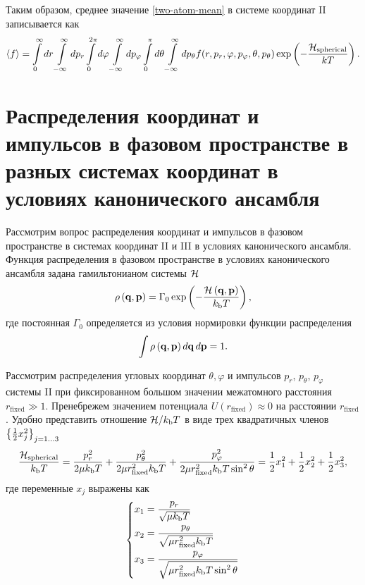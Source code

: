 Таким образом, среднее значение \eqref{two-atom-mean} в системе координат II записывается как
\begin{gather}
    \langle f \rangle = \int\limits_0^\infty dr \int\limits_{-\infty}^\infty dp_r \int\limits_0^{2\pi} d\varphi \int\limits_{-\infty}^\infty dp_\varphi \int\limits_0^\pi d\theta \int\limits_{-\infty}^\infty dp_\theta f(r, p_r, \varphi, p_\varphi, \theta, p_\theta) \exp \left( -\frac{\mathcal{H}_\text{spherical}}{k T} \right). \label{two-atom-mean-spherical}
\end{gather}

\section{Распределения координат и импульсов в фазовом пространстве в разных системах координат в условиях канонического ансамбля}

Рассмотрим вопрос распределения координат и импульсов в фазовом пространстве в системах координат II и III в условиях канонического ансамбля. Функция распределения в фазовом пространстве в условиях канонического ансамбля задана гамильтонианом системы $\mathcal{H}$ \cite{hill} 
\begin{gather}
    \rho \left( \mathbf{q}, \mathbf{p} \right) = \Gamma_0 \exp \left( -\frac{\mathcal{H} \left( \mathbf{q}, \mathbf{p} \right)}{k_\text{b} T} \right),
\end{gather}
% 
где постоянная $\Gamma_0$ определяется из условия нормировки функции распределения
\begin{gather}
    \int \rho \left( \mathbf{q}, \mathbf{p} \right) d \mathbf{q} \, d\mathbf{p} = 1.
\end{gather}

Рассмотрим распределения угловых координат $\theta, \varphi$ и импульсов $p_r$, $p_\theta$, $p_\varphi$ системы II при фиксированном большом значении межатомного расстояния $r_\text{fixed} \gg 1$. Пренебрежем значением потенциала $U(r_\text{fixed}) \approx 0$ на расстоянии $r_\text{fixed}$. Удобно представить отношение $\mathcal{H} / k_\text{b} T$ в виде трех квадратичных членов $\left\{ \frac{1}{2} x_j^2 \right\}_{j = 1 \dots 3}$
\begin{gather}
    \frac{\mathcal{H}_\text{spherical}}{k_\text{b} T} = \frac{p_r^2}{2 \mu k_\text{b} T} + \frac{p_\theta^2}{2 \mu r_\text{fixed}^2 k_\text{b} T} + \frac{p_\varphi^2}{2 \mu r_\text{fixed}^2 k_\text{b} T \sin^2 \theta} = \frac{1}{2} x_1^2 + \frac{1}{2} x_2^2 + \frac{1}{2} x_3^2, \label{two-atom-spherical-hamiltonian-xs} 
\end{gather}
%
где переменные $x_j$ выражены как
\begin{gather}
    \left\{
    \begin{aligned}
        x_1 &= \frac{p_r}{\sqrt{\mu k_\text{b} T}} \\
        x_2 &= \frac{p_\theta}{\sqrt{\mu r_\text{fixed}^2 k_\text{b} T}} \\
        x_3 &= \frac{p_\varphi}{\sqrt{\mu r_\text{fixed}^2 k_\text{b} T \sin^2 \theta}}
    \end{aligned}
\right. \label{two-atom-xs}
\end{gather}

